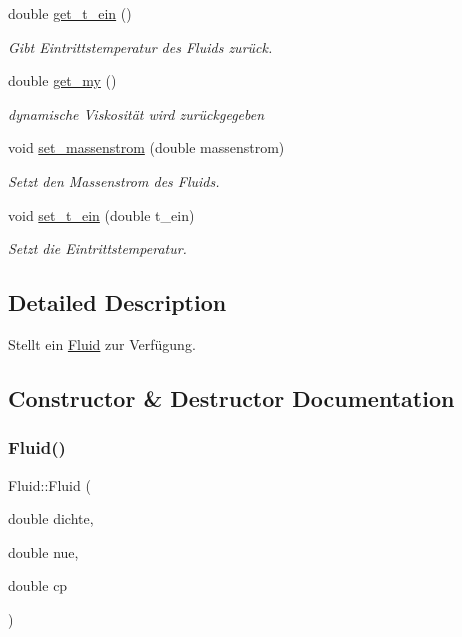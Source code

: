 \begin{DoxyCompactItemize}
double \hyperlink{class_fluid_a60d0c9269a8c8af00bf8828c7f764537}{get\+\_\+t\+\_\+ein} ()
\begin{DoxyCompactList}\small\item\em Gibt Eintrittstemperatur des Fluids zurück. \end{DoxyCompactList}\item 
double \hyperlink{class_fluid_a80d39a71b73f5ac4cffcaceb61b9e0ee}{get\+\_\+my} ()
\begin{DoxyCompactList}\small\item\em dynamische Viskosität wird zurückgegeben \end{DoxyCompactList}\item 
void \hyperlink{class_fluid_af70884f77d5dd43499fcc70969100498}{set\+\_\+massenstrom} (double massenstrom)
\begin{DoxyCompactList}\small\item\em Setzt den Massenstrom des Fluids. \end{DoxyCompactList}\item 
void \hyperlink{class_fluid_a9449846d8fd4bf31d8685eefa55d4a57}{set\+\_\+t\+\_\+ein} (double t\+\_\+ein)
\begin{DoxyCompactList}\small\item\em Setzt die Eintrittstemperatur. \end{DoxyCompactList}\end{DoxyCompactItemize}


\subsection{Detailed Description}
Stellt ein \hyperlink{class_fluid}{Fluid} zur Verfügung. 

\subsection{Constructor \& Destructor Documentation}
\mbox{\label{class_fluid_a2b1fada8a43d2edf1424e4f5915d6e06}} 
\subsubsection{\texorpdfstring{Fluid()}{Fluid()}}
{\footnotesize\ttfamily Fluid\+::\+Fluid (\begin{DoxyParamCaption}\item[{double}]{dichte,  }\item[{double}]{nue,  }\item[{double}]{cp }\end{DoxyParamCaption})}

